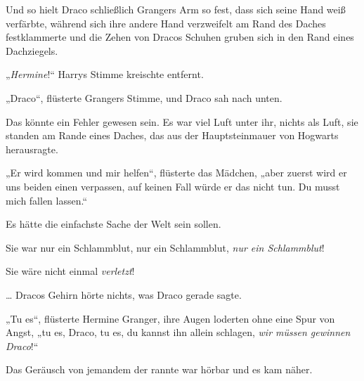 Und so hielt Draco schließlich Grangers Arm so fest, dass sich seine Hand weiß verfärbte, während sich ihre andere Hand verzweifelt am Rand des Daches festklammerte und die Zehen von Dracos Schuhen gruben sich in den Rand eines Dachziegels.

„\emph{Hermine}!“ Harrys Stimme kreischte entfernt.

„Draco“, flüsterte Grangers Stimme, und Draco sah nach unten.

Das könnte ein Fehler gewesen sein. Es war viel Luft unter ihr, nichts als Luft, sie standen am Rande eines Daches, das aus der Hauptsteinmauer von Hogwarts herausragte.

„Er wird kommen und mir helfen“, flüsterte das Mädchen, „aber zuerst wird er uns beiden einen  verpassen, auf keinen Fall würde er das nicht tun. Du musst mich fallen lassen.“

Es hätte die einfachste Sache der Welt sein sollen.

Sie war nur ein Schlammblut, nur ein Schlammblut, \emph{nur ein Schlammblut}!

Sie wäre nicht einmal \emph{verletzt}!

… Dracos Gehirn hörte nichts, was Draco gerade sagte.

„Tu es“, flüsterte Hermine Granger, ihre Augen loderten ohne eine Spur von Angst, „tu es, Draco, tu es, du kannst ihn allein schlagen, \emph{wir müssen gewinnen Draco}!“

Das Geräusch von jemandem der rannte war hörbar und es kam näher.

